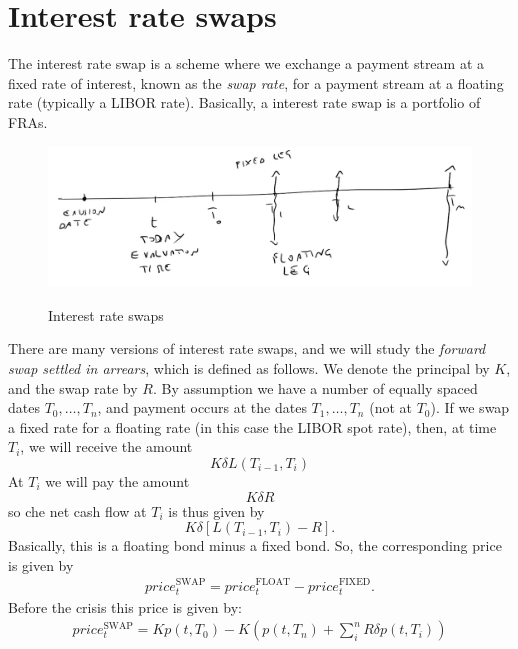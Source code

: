 \section{Interest rate swaps} %
The interest rate swap is a scheme where we exchange a payment stream at a fixed rate of interest, known as the \emph{swap rate}, for a payment stream at a floating rate (typically a LIBOR rate). Basically, a interest rate swap is a portfolio of FRAs.
\begin{figure}[h]
    \centering
    \includegraphics[scale=0.22]{fig/tmp/fig41}
    \label{fig:swap}
    \caption{Interest rate swaps}
\end{figure}
\newline There are many versions of interest rate swaps, and we will study the \emph{forward swap settled in arrears}, which is defined as follows. We denote the principal by $K$, and the swap rate by $R$. By assumption we have a number of equally spaced dates $T_0,\dots,T_n$, and payment occurs at the dates $T_1,\dots,T_n$ (not at $T_0$). If we swap a fixed rate for a floating rate (in this case the LIBOR spot rate), then, at time $T_i$, we will receive the amount
\begin{equation*}
    K\delta L(T_{i-1},T_i)
\end{equation*}
At $T_i$ we will pay the amount
\begin{equation*}
    K\delta R
\end{equation*}
so che net cash flow at $T_i$ is thus given by
\begin{equation}
    K\delta [L(T_{i-1}, T_i) - R].
\end{equation}
Basically, this is a floating bond minus a fixed bond. So, the corresponding price is given by
\begin{align*}
    price_t^{\text{SWAP}} = price_t^{\text{FLOAT}} - price_t^{\text{FIXED}}.
\end{align*}
Before the crisis this price is given by:
\begin{align}
    price_t^{\text{SWAP}} = Kp(t,T_0) - K\left(p(t,T_n) + \sum_i^n R\delta p(t,T_i)\right)
\end{align}
